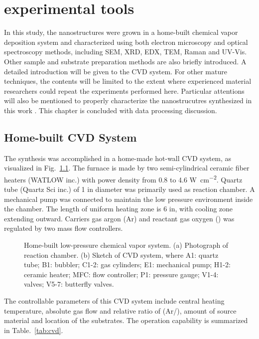 
\chapter{experimental tools}

In this study, the nanostructures were grown in a home-built chemical vapor deposition system and characterized using both electron microscopy and optical spectroscopy methods, including SEM, XRD, EDX, TEM, Raman and UV-Vis. Other sample and substrate preparation methods are also briefly introduced. A detailed introduction will be given to the CVD system. For other mature techniques, the contents will be limited to the extent where experienced material researchers could repeat the experiments performed here. Particular attentions will also be mentioned to properly characterize the nanostrucutres synthesized in this work . This chapter is concluded with data processing discussion. 


\section{Home-built CVD System}

The synthesis was accomplished in a home-made hot-wall CVD system, as visualized in Fig.~\ref{fig:ch2cvd}. The furnace is made by two semi-cylindrical ceramic fiber heaters (WATLOW inc.) with power density from 0.8 to 4.6 \si{W cm^{-2}}. Quartz tube (Quartz Sci inc.) of 1 in diameter was primarily used as reaction chamber. A mechanical pump was connected to maintain the low pressure environment inside the chamber. The length of uniform heating zone is 6 in, with cooling zone extending outward. Carriers gas argon (Ar) and reactant gas oxygen () was regulated by two mass flow controllers.

\begin{figure}[htb]
\centering
{}

\caption[CVD system]{Home-built low-pressure chemical vapor system. (a) Photograph of reaction chamber. (b) Sketch of CVD system, where A1: quartz tube; B1: bubbler; C1-2: gas cylinders; E1: mechanical pump; H1-2: ceramic heater; MFC: flow controller; P1: pressure gauge; V1-4: valves; V5-7: butterfly valves.}
\label{fig:ch2cvd}
\end{figure}

The controllable parameters of this CVD system include central heating temperature, absolute gas flow and relative ratio of (Ar/), amount of source material and location of the substrates. The operation capability is summarized in Table.~\ref{tab:cvd}.

